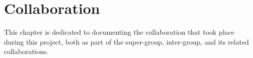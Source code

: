 \chapter{Collaboration}
This chapter is dedicated to documenting the collaboration that took place during this project, both as part of the super-group, inter-group, and \gls{its} related collaborations.



